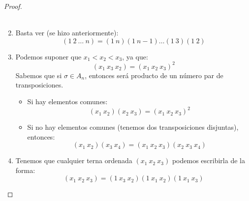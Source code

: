 \begin{prop}
\begin{proof}
\begin{enumerate}[label=(\alph*)]
\begin{align*}
                \end{align*}
            \item Basta ver (se hizo anteriormente):
                \begin{equation*}
                    (1\ 2\ \ldots\ n) = (1\ n)(1\ n-1)\ldots (1\ 3)(1\ 2)
                \end{equation*}
            \item Podemos suponer que $x_1<x_2<x_3$, ya que:
                \begin{equation*}
                    (x_1\ x_3\ x_2) = {(x_1\ x_2\ x_3)}^{2}
                \end{equation*}
                Sabemos que si $\sigma\in A_n$, entonces será producto de un número par de transposiciones.
                \begin{itemize}
                    \item Si hay elementos comunes:
                        \begin{equation*}
                            (x_1\ x_2)(x_2\ x_3) = {(x_1\ x_2\ x_3)}^{2}
                        \end{equation*}
                    \item Si no hay elementos comunes (tenemos dos transposiciones disjuntas), entonces:
                        \begin{equation*}
                            (x_1\ x_2)(x_3\ x_4) = (x_1\ x_2\ x_3)(x_2\ x_3\ x_4)
                        \end{equation*}
                \end{itemize}
            \item Tenemos que cualquier terna ordenada $(x_1\ x_2\ x_3)$ podemos escribirla de la forma:
                \begin{equation*}
                    (x_1\ x_2\ x_3) = (1\ x_3\ x_2)(1\ x_1\ x_2)(1\ x_1\ x_3)
                \end{equation*}
        \end{enumerate}
    \end{proof}
\end{prop}

